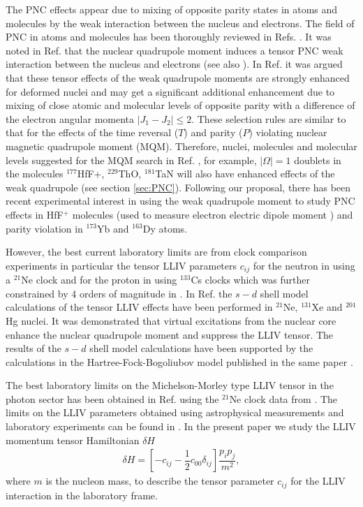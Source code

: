 \documentclass[8pt,a4paper, twoside]{report}
\begin{document}
The PNC effects appear due to mixing of opposite parity states in atoms and molecules by the weak interaction between the nucleus and electrons. The field  of PNC in atoms and molecules has been thoroughly reviewed in Refs.  \cite{KhriplovichPNC,GingesReview,RobertsReview}. It was noted in Ref.  \cite{FS78} that the nuclear quadrupole moment induces a tensor PNC weak interaction between the nucleus and electrons (see also  \cite{KhriplovichPNC,KP91}). In Ref. \cite{Flambaum2016} it was argued that these tensor  effects of the weak quadrupole moments are strongly enhanced for deformed nuclei and may get a significant additional enhancement due to mixing of  close atomic and molecular levels of opposite parity with a  difference of the electron angular momenta $|J_1-J_2| \le 2$. These selection rules are similar to that for the effects of the time reversal ($T$) and parity ($P$) violating nuclear magnetic quadrupole moment (MQM). Therefore, nuclei, molecules and molecular levels  suggested for the MQM search in Ref. \cite{Flambaum2014},  for example,  $|\Omega |=1$ doublets in the molecules $^{177}$HfF+, $^{229}$ThO, $^{181}$TaN will also have enhanced effects of the weak quadrupole (see section \ref{sec:PNC}). Following our proposal, there has been recent experimental interest in using the weak quadrupole moment to study PNC effects in HfF$^{+}$ molecules (used to measure electron electric dipole moment \cite{Cairncross2017}) and parity violation in $^{173}$Yb \cite{Antypas2017} and $^{163}$Dy \cite{Leefer2017} atoms. 


 However, the best current laboratory limits are from clock comparison experiments \cite{Prestage1985, Chupp1989, Hohensee2013, Dzuba2016} in particular the tensor LLIV parameters $c_{ij}$ for the neutron in \cite{Smiciklas2011} using a $^{21}$Ne clock and for the proton in \cite{Wolf2006} using $^{133}$Cs clocks which was further constrained by 4 orders of magnitude in \cite{Flambaum2016}.  In Ref. \cite{Brown2016} the $s-d$ shell model calculations of the tensor LLIV effects have been performed in $^{21}$Ne, $^{131}$Xe and $^{201}$Hg nuclei. It was demonstrated that virtual excitations from the nuclear core enhance the nuclear quadrupole moment and suppress the LLIV tensor.  The results of the $s-d$ shell model calculations have been supported by the calculations in the Hartree-Fock-Bogoliubov model published in the same paper \cite{Brown2016}.

The best laboratory limits on the Michelson-Morley type LLIV tensor in the photon sector has been obtained in Ref. \cite{FlambaumRomalis2017}  using the $^{21}$Ne clock data from  \cite{Smiciklas2011}.  
The limits on the LLIV parameters  obtained using astrophysical measurements and laboratory experiments can be found in \cite{Kostelecky1999, LorentzDataTables2017}. In the present paper we study  the LLIV momentum tensor Hamiltonian $\delta H$  \cite{Kostelecky1999}
\begin{align} \label{eq:HamilQuadShift}
\delta H = \left[-c_{ij} -\dfrac{1}{2}c_{00}\delta_{ij}\right]\dfrac{p_ip_j}{m^2},
\end{align}
 where $m$ is the nucleon mass,  to describe the tensor parameter $c_{ij}$  for the LLIV interaction \cite{Kostelecky1999} in the laboratory frame. 
\end{document}
